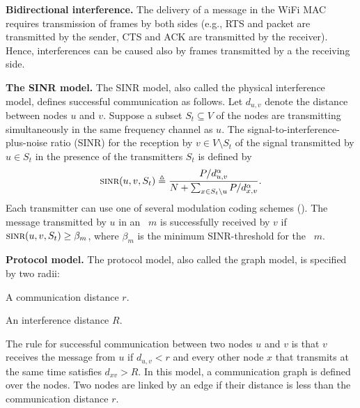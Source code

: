 \documentclass[11pt]{article}
\newenvironment{proof sketch}[1]{\noindent {\emph{Proof sketch of #1:}}}{\hfill \qed}
\newcommand{\eqdf}{\triangleq}
\newcommand{\SINR}{\text{\sc{sinr}}}
\newcommand{\MCS}{\text{\sc{mcs}}}
\begin{document}
\medskip
\noindent
\textbf{Bidirectional interference.}  The delivery of a message in the
WiFi MAC requires transmission of frames by both sides (e.g., RTS and
packet are transmitted by the sender, CTS and ACK are transmitted by
the receiver). Hence, interferences can be caused also by frames
transmitted by a the receiving side.

\medskip
\noindent
\textbf{The SINR model.}  The SINR model, also called the physical
interference model, defines successful communication as follows.  Let
$d_{u,v}$ denote the distance between nodes $u$ and $v$.  Suppose a
subset $S_t\subseteq V$ of the nodes are transmitting simultaneously
in the same frequency channel as $u$.  The
signal-to-interference-plus-noise ratio (SINR) for the reception by
$v\in V\setminus S_t$ of the signal transmitted by $u\in S_t$ in the
presence of the transmitters $S_t$ is defined by
\[
\SINR(u,v,S_t) \eqdf \frac{P/d_{u,v}^{\alpha}}{N+\sum_{x\in
    S_t\setminus{u}} P/d_{x,v}^{\alpha}}.
\]
Each transmitter can use one of several modulation coding schemes
(\MCS).  The message transmitted by $u$ in an \MCS\ $m$ is
successfully received by $v$ if $\SINR(u,v,S_t)\geq \beta_m$, where
$\beta_m$ is the minimum SINR-threshold for the \MCS\ $m$.

\medskip
\noindent
\textbf{Protocol model.}  The protocol model, also called the graph
model, is specified by two radii:
\begin{inparaenum}[(i)]
\item A communication distance $r$.
\item An interference distance $R$.
\end{inparaenum}
The rule for successful communication between two nodes $u$ and $v$ is
that $v$ receives the message from $u$ if $d_{u,v}<r$ and every other
node $x$ that transmits at the same time satisfies $d_{xv}> R$.  In
this model, a communication graph is defined over the nodes.  Two
nodes are linked by an edge if their distance is less than the
communication distance $r$.
\end{document}
